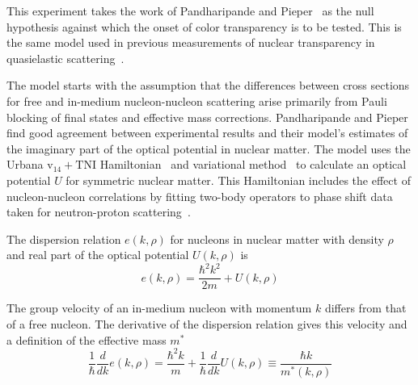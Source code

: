 This experiment takes the work of Pandharipande and
Pieper~\cite{Pandharipande_1992} as the null hypothesis against which the onset
of color transparency is to be tested.
This is the same model used in previous measurements of nuclear transparency
in quasielastic
scattering~\cite{Garrow_2002,Abbot_1998,Rohe_2005,Garino_1992}.

The model starts with the assumption that the differences between cross
sections for free and in-medium nucleon-nucleon scattering arise primarily from
Pauli blocking of final states and effective mass corrections.
Pandharipande and Pieper find good agreement between experimental results and
their model's estimates of the imaginary part of the optical potential in
nuclear matter.
The model uses the
Urbana $\text{v}_{14}+\text{TNI}$ Hamiltonian~\cite{Lagaris_1981_331, Lagaris_1981_349}
and variational method~\cite{Wiringa_1988, Friedman_1981}
to calculate an optical potential $U$ for symmetric nuclear matter.
This Hamiltonian includes the effect of nucleon-nucleon correlations by fitting
two-body operators to phase shift data taken for neutron-proton
scattering~\cite{Arndt_1966}.


The dispersion relation $e(k,\rho)$ for nucleons in nuclear matter with density
$\rho$ and real part of the optical potential $U(k,\rho)$ is
\begin{equation}
    e(k,\rho) = \frac{\hbar^2 k^2}{2m} + U(k,\rho)
\end{equation}

The group velocity of an in-medium nucleon with momentum $k$ differs from that of a
free nucleon.
The derivative of the dispersion relation gives this velocity and a
definition of the effective mass $m^*$
\begin{equation}
    \frac{1}{\hbar}\frac{d}{dk}e(k,\rho)
        = \frac{\hbar^2 k}{m} + \frac{1}{\hbar}\frac{d}{dk}U(k,\rho)
        \equiv \frac{\hbar k}{m^*(k,\rho)}
\end{equation}

